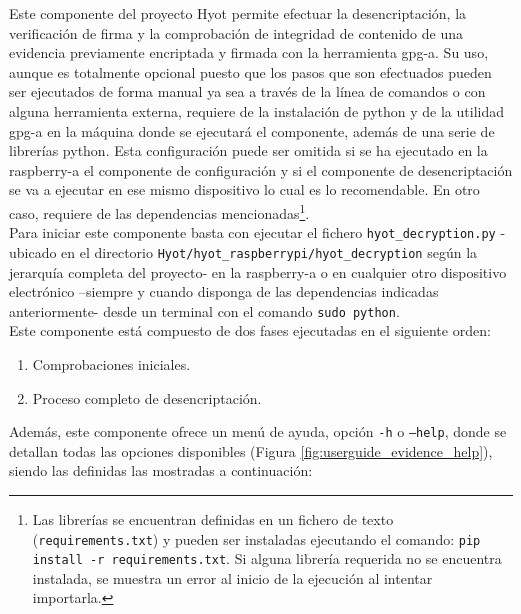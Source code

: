 \documentclass[12pt,a4paper, twoside]{report}
\begin{document}
	 Este componente del proyecto Hyot permite efectuar la desencriptación, la verificación de firma y la comprobación de integridad de contenido de una evidencia previamente encriptada y firmada con la herramienta \gls{gpg-a}. Su uso, aunque es totalmente opcional puesto que los pasos que son efectuados pueden ser ejecutados de forma manual ya sea a través de la línea de comandos o con alguna herramienta externa, requiere de la instalación de \gls{python} y de la utilidad \gls{gpg-a} \cite{gpg} en la máquina donde se ejecutará el componente, además de una serie de librerías \gls{python}. Esta configuración puede ser omitida si se ha ejecutado en la \gls{raspberry-a} el componente de configuración y si el componente de desencriptación se va a ejecutar en ese mismo dispositivo lo cual es lo recomendable. En otro caso, requiere de las dependencias mencionadas\footnote{Las librerías se encuentran definidas en un fichero de texto (\texttt{requirements.txt}) y pueden ser instaladas ejecutando el comando: \texttt{pip install -r requirements.txt}. Si alguna librería requerida no se encuentra instalada, se muestra un error al inicio de la ejecución al intentar importarla.}. \\
	 
	Para iniciar este componente basta con ejecutar el fichero \texttt{hyot\_decryption.py} -ubicado en el directorio \texttt{Hyot/hyot\_raspberrypi/hyot\_decryption} según la jerarquía completa del proyecto- en la \gls{raspberry-a} o en cualquier otro dispositivo electrónico –siempre y cuando disponga de las dependencias indicadas anteriormente- desde un terminal con el comando \texttt{sudo python}. \\

	Este componente está compuesto de dos fases ejecutadas en el siguiente orden:

	\begin{enumerate}
		\item Comprobaciones iniciales.
		\item Proceso completo de desencriptación.
	\end{enumerate}
	
	Además, este componente ofrece un menú de ayuda, opción \texttt{-h} o \texttt{--help}, donde se detallan todas las opciones disponibles (Figura \ref{fig:userguide_evidence_help}), siendo las definidas las mostradas a continuación:
	
\end{document}
